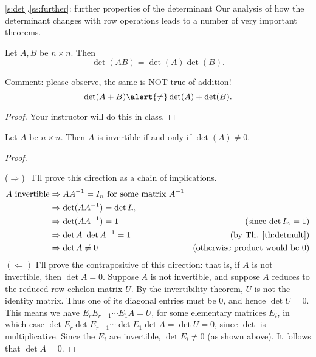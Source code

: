 \begin{frame}{\ref{s:det}.\ref{ss:further}: further properties of the determinant}
Our analysis of how the determinant changes with row operations leads to a number of very important theorems. 
\begin{theorem} \label{th:detmult} Let $A,B$ be $n\times n$. Then 
\[
\det(AB)=\det(A)\det(B).
\]
\end{theorem}
\pause\alert{Comment:} please observe, the same is NOT true of addition! 
\[
\det(A+B)\alert{\ne}\det(A)+\det(B).
\]
\pause
\begin{proof}
Your instructor will do this in class. 
\end{proof}
\end{frame}
\begin{frame}
\begin{theorem}\label{th:detinv}
Let $A$ be $n\times n$. Then $A$ is invertible if and only if $\det(A)\ne 0$. 
\end{theorem}
\pause
\begin{proof} \ 

\alert{($\Rightarrow$)} \ I'll prove this direction as a chain of implications. 
\pause
\begin{align*}
A \text{ invertible}&\Rightarrow AA^{-1}=I_n \text{ for some matrix $A^{-1}$}\\
&\Rightarrow \det(AA^{-1})=\det I_n \\
&\Rightarrow \det(AA^{-1})=1 &\text{(since $\det I_n=1$)}\\
&\Rightarrow \det A\ \det A^{-1}=1 &\text{(by Th. \ref{th:detmult})}\\
&\Rightarrow \det A\ne 0 &\text{(otherwise product would be $0$)}
\end{align*} 
\pause
\alert{$(\Leftarrow)$} I'll prove the \alert{contrapositive} of this direction: that is, if $A$ is not invertible, then $\det A=0$. 
\pause 
Suppose $A$ is not invertible, and suppose $A$ reduces to the \alert{reduced} row echelon matrix $U$. By the invertibility theorem, $U$ is not the identity matrix. Thus one of its diagonal entries must be 0, and hence $\det U=0$. 
\bpause
This means we have 
$
E_rE_{r-1}\cdots E_1A=U
$, for some elementary matrices $E_i$, in which case $\det E_r\det E_{r-1} \cdots \det E_1\det A=\det U=0$, since $\det$ is multiplicative. \pause Since the $E_i$ are invertible, $\det E_i\ne 0$ (as shown above). It follows that $\det A=0$. 
\end{proof}
%
\end{frame}
